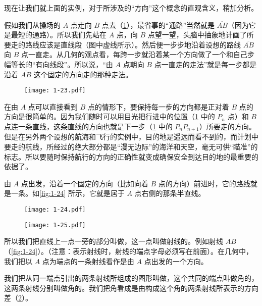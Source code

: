 现在让我们就上面的实例，对于所涉及的“方向”这个概念的直观含义，稍加分析。

假如我们从操场的 $A$ 点走向 $B$ 点去（\cref{fig:1-23}），最省事的“通路”当然就是 $\overline{AB}$（因为它是最短的通路）。所以我们先站在 $A$ 点，向 $B$ 点望一望，头脑中抽象地计画了所要走的路线应该是直线段（图中虚线所示）。然后便一步步地沿着设想的路线 $\overline{AB}$ 向 $B$ 点一直走。从几何的观点看，每跨一步就沿着某一个方向做了一个和自己步幅等长的“有向线段”。所以说，“由 $A$ 点朝向 $B$ 点一直走的走法”就是每一步都是沿着 $\overline{AB}$ 这个固定的方向走的那种走法。


\begin{figure}
	\texttt{[image: 1-23.pdf]}
	\caption{}\label{fig:1-23}
\end{figure}

在由 $A$ 点可以直接看到 $B$ 点的情形下，要保持每一步的方向都是正对着 $B$ 点的方向是很简单的。因为我们随时可以用目光把行进中的位置（\cref{fig:1-23} 中的 $P_n$ 点）和 $B$ 点连一条直线，这条直线的方向也就是下一步（\cref{fig:1-23} 中的 $P_nP_{n+1}$）所要走的方向。但是在另外两个设想的航海和飞行的实例中，目的地是遥远而看不到的，而计划中要走的航线，所经过的绝大部分都是“漫无边际”的海洋和天空，毫无可供“瞄准”的标志。所以要随时保持航行的方向的正确性就变成确保安全到达目的地的最重要的依据了。

由 $A$ 点出发，沿着一个固定的方向（比如向着 $B$ 点的方向）前进时，它的路线就是一条。如\cref{fig:1-24} 所示，它就是居于 $A$ 点右侧的那条半直线。
\begin{figure}
  \begin{minipage}[b]{0.48\linewidth}
    \centering
		\texttt{[image: 1-24.pdf]}
    \caption{}\label{fig:1-24}
  \end{minipage}
  \begin{minipage}[b]{0.48\linewidth}
    \centering
    \texttt{[image: 1-25.pdf]}
    \caption{}\label{fig:1-25}
  \end{minipage}
\end{figure}

所以我们把直线上一点一旁的部分叫做，这一点叫做射线的。例如射线 $AB$（\cref{fig:1-24}）。（注意：表示射线时，射线的端点字母必须写在前面）。在几何中，我们把以 $A$ 点为端点的一条射线看作是由 $A$ 点出发的一个方向。

我们把从同一端点引出的两条射线所组成的图形叫做，这个共同的端点叫做角的，这两条射线分别叫做角的。我们把角看成是由构成这个角的两条射线所表示的方向差（\cref{fig:1-25}）。

